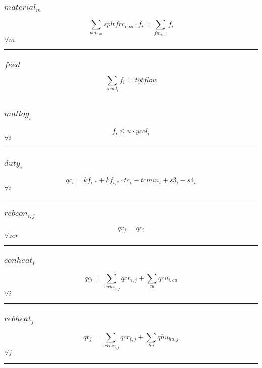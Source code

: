 \documentclass[11pt]{article}
\begin{document}
\subsubsection*{$material_{m}$}
\begin{equation}
\sum_{pm_{i,m}} spltfrc_{i,m} \cdot f_{i} = \sum_{fm_{i,m}} f_{i}
\end{equation}
\hfill
$
\forall m
$\vspace{5pt}
\hrule
\subsubsection*{$feed$}
\begin{equation}
\sum_{zlead_{i}} f_{i} = totflow
\end{equation}
\vspace{5pt}
\hrule
\subsubsection*{$matlog_{i}$}
\begin{equation}
f_{i} \leq u \cdot ycol_{i}
\end{equation}
\hfill
$
\forall i
$\vspace{5pt}
\hrule
\subsubsection*{$duty_{i}$}
\begin{equation}
qc_{i} = kf_{i,*} + kf_{i,*} \cdot tc_{i} - tcmin_{i} + s3_{i} - s4_{i}
\end{equation}
\hfill
$
\forall i
$\vspace{5pt}
\hrule
\subsubsection*{$rebcon_{i,j}$}
\begin{equation}
qr_{j} = qc_{i}
\end{equation}
\hfill
$
\forall zcr
$\vspace{5pt}
\hrule
\subsubsection*{$conheat_{i}$}
\begin{equation}
qc_{i} = \sum_{zcrhx_{i,j}} qcr_{i,j} + \sum_{cu} qcu_{i,cu}
\end{equation}
\hfill
$
\forall i
$\vspace{5pt}
\hrule
\subsubsection*{$rebheat_{j}$}
\begin{equation}
qr_{j} = \sum_{zcrhx_{i,j}} qcr_{i,j} + \sum_{hu} qhu_{hu,j}
\end{equation}
\hfill
$
\forall j
$\vspace{5pt}
\hrule
\end{document}
